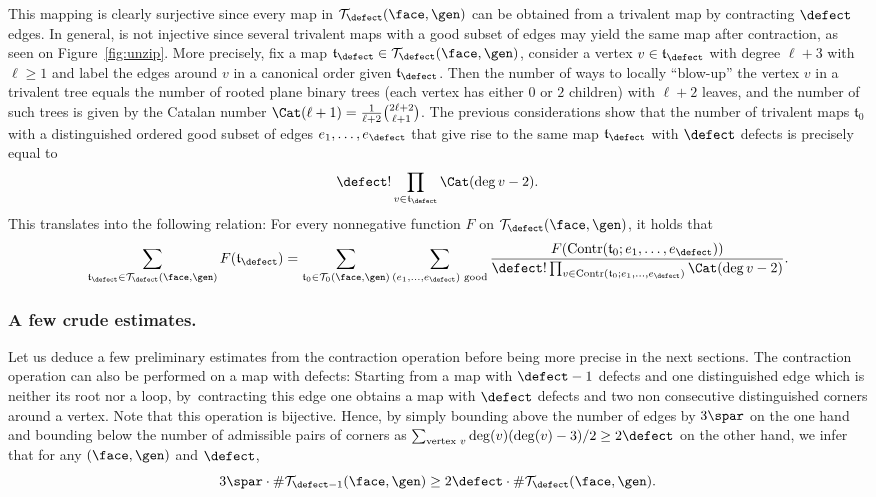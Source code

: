 This mapping is clearly surjective since every map in $\mathcal{T}_\defect(\face, \gen)$ can be obtained from a trivalent map by contracting $\defect$ edges. In general, is not injective since several trivalent maps with a good subset of edges may yield the same map after contraction, as seen on Figure~\ref{fig:unzip}.
More precisely, fix a map $\mathfrak{t}_\defect \in \mathcal{T}_\defect(\face, \gen)$, consider a vertex $v \in \mathfrak{t}_\defect$ with degree $\ell+3$ with $\ell \geq 1$ and label the edges around $v$ in a canonical order given $\mathfrak{t}_\defect$. Then the number of ways to locally ``blow-up'' the vertex $v$ in a trivalent tree equals the number of rooted plane binary trees (each vertex has either $0$ or $2$ children) with $\ell+2$ leaves, and the number of such trees is given by the Catalan number $\Cat(\ell+1) = \frac{1}{\ell+2} \binom{2\ell+2}{\ell+1}$. The previous considerations show that the number of trivalent maps $\mathfrak{t}_0$ with a distinguished ordered good subset of edges $e_1, \dots, e_\defect$ that give rise to the same map $\mathfrak{t}_\defect$ with $\defect$ defects is precisely equal to\[
\defect! \prod_{v \in \mathfrak{t}_\defect} \Cat(\deg v - 2).
\]
This translates into the following relation: For every nonnegative function $F$ on $\mathcal{T}_\defect(\face, \gen)$, it holds that
\begin{equation}\label{eq:bijection_defauts}
\sum_{\mathfrak{t}_\defect \in \mathcal{T}_\defect(\face, \gen)} F(\mathfrak{t}_\defect)
= \sum_{\mathfrak{t}_0 \in \mathcal{T}_0(\face, \gen)} \sum_{(e_1, \dots, e_\defect) \text{ good}} \frac{F(\mathrm{Contr}(\mathfrak{t}_0 ; e_1, \dots, e_\defect))}{\defect! \prod_{v \in \mathrm{Contr}(\mathfrak{t}_0 ; e_1, \dots, e_\defect)} \Cat(\deg v - 2)}.
\end{equation}

\subsubsection*{A few crude estimates.}
Let us deduce a few preliminary estimates from the contraction operation before being more precise in the next sections.
The contraction operation can also be performed on a map with defects: Starting from a map with $\defect-1$ defects and one distinguished edge which is neither its root nor a loop, by~contracting this edge one obtains a map with $\defect$ defects and two non consecutive distinguished corners around a vertex. Note that this operation is bijective. Hence, by simply bounding above the number of edges by $3\spar$ on the one hand and bounding below the number of admissible pairs of corners as $\sum_{\textrm{vertex } v} \deg(v) (\deg(v)-3) / 2 \ge 2\defect$ on the other hand, we infer that for any $(\face, \gen)$ and $\defect$,
\begin{equation}\label{eq:crude1}
3 \spar \cdot \# \mathcal{T}_{\defect-1}(\face,\gen) \ge 2 \defect \cdot \# \mathcal{T}_{\defect}(\face,\gen).
\end{equation}

